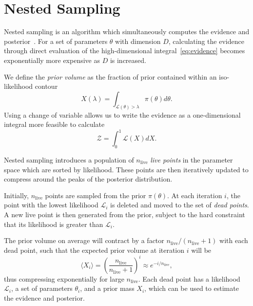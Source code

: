 \documentclass[11pt]{article}
\begin{document}
    \section{Nested Sampling}\label{sec:nested_sampling}
    Nested sampling is an algorithm which simultaneously computes
    the evidence and posterior~\cite{Skilling2006, Handley_polychord, NS_Review_2022}.
    For a set of parameters $\theta$ with dimension $D$, calculating the evidence through direct evaluation of the
    high-dimensional integral~\eqref{eq:evidence} becomes exponentially more expensive as $D$ is increased.

    We define the \emph{prior volume} as the fraction of prior contained within an iso-likelihood contour
    \begin{equation}\label{eq:prior_volume}
    X(\lambda) = \int_{\mathcal{L}(\theta)>\lambda} \pi(\theta) d\theta.
    \end{equation}
    Using a change of variable allows us to write the evidence as a one-dimensional integral more feasible to calculate
    \begin{equation}\label{eq:evidence_ns}
    \mathcal{Z} = \int_0^1 {\mathcal{L}(X)} dX.
    \end{equation}

    Nested sampling introduces a population of $n_{\text{live}}$ \emph{live points} in the parameter space which are sorted
    by likelihood.
    These points are then iteratively updated to compress around the peaks of the posterior distribution.

    Initially, $n_{\text{live}}$ points are sampled from the prior $\pi(\theta)$.
    At each iteration $i$, the point with the lowest likelihood $\mathcal{L}_i$ is deleted and moved to the set
    of \emph{dead points}.
    A new live point is then generated from the prior, subject to the hard constraint that its likelihood is
    greater than $\mathcal{L}_i$.

    The prior volume on average will contract by a factor $n_{\text{live}}/(n_{\text{live}}+1)$ with each dead point, such that the
    expected prior volume at iteration $i$ will be
    \begin{equation}\label{eq:exp_prior_volume}
    \langle X_i \rangle = \left( \frac{n_{\text{live}}}{n_{\text{live}} + 1} \right)^i \approx e^{-i/n_{\text{live}}},
    \end{equation}
    thus compressing exponentially for large $n_{\text{live}}$.
    Each dead point has a likelihood $\mathcal{L}_i$, a set of parameters $\theta_i$, and a prior mass $X_i$, which can
    be used to estimate the evidence and posterior.
\end{document}
